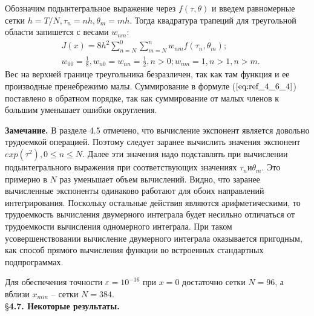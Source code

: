 Обозначим подынтегральное выражение через $f(\tau, \theta)$ и введем
равномерные сетки $h = T/N, \tau_n = nh, \theta_m = mh$. Тогда квадратура трапеций для
треугольной области запишется с весами $w_{nm}$:
\begin{equation}
\begin{aligned}
&J(x)=8h^2 \sum_{n=N}^0 \sum_{m=N}^n w_{nm} f(\tau_n, \theta_m); \\
&w_{00}=\frac{1}{8}, w_{n0}=w_{nn}=\frac{1}{2},n>0;w_{nm}=1,n>1,n>m.
\end{aligned}
\label{eq:ref_4_6_4}
\end{equation}
Вес на верхней границе треугольника безразличен, так как там функция и ее
производные пренебрежимо малы. Суммирование в формуле ($\ref{eq:ref_4_6_4}$) поставлено в
обратном порядке, так как суммирование от малых членов к большим
уменьшает ошибки округления.

\textbf{Замечание.} В разделе 4.5 отмечено, что вычисление экспонент является довольно трудоемкой
операцией. Поэтому следует заранее вычислить значения экспонент $exp(\tau^2), 0 \leqslant n \leqslant N$. Далее эти значения надо подставлять при вычислении
подынтегрального выражения при соответствующих значениях $\tau_n и \theta_m$. Это
примерно в $N$ раз уменьшает объем вычислений. Видно, что заранее
вычисленные экспоненты одинаково работают для обоих направлений
интегрирования. Поскольку остальные действия являются арифметическими, то
трудоемкость вычисления двумерного интеграла будет несильно отличаться от
трудоемкости вычисления одномерного интеграла. При таком
усовершенствовании вычисление двумерного интеграла оказывается
пригодным, как способ прямого вычисления функции во встроенных
стандартных подпрограммах.

Для обеспечения точности $\varepsilon = 10^{-16}$ при $x = 0$ достаточно сетки $N = 96$, а
вблизи $x_{min}$ – сетки $N = 384$.
\\

\S \textbf{4.7. Некоторые результаты.}
\\

